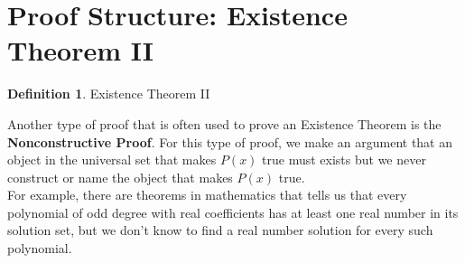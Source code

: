 \documentclass{book}
\theoremstyle{definition}
\newtheorem{definition}{Definition}[section]
\theoremstyle{remark}
\begin{document}
\newpage
\section{Proof Structure: Existence Theorem II}

\begin{definition}
Existence Theorem II

Another type of proof that is often used to prove  an Existence Theorem is the {\bf Nonconstructive Proof}. For this type of proof, we make an argument that an object in the universal set that makes $P(x)$ true must exists but we never construct or name the object that makes $P(x)$ true. \\
For example, there are theorems in mathematics that tells us that every polynomial of odd degree with real coefficients has at least one real number in its solution set, but we don't know to find a real number solution for every such polynomial. 
\end{definition}
\end{document}

